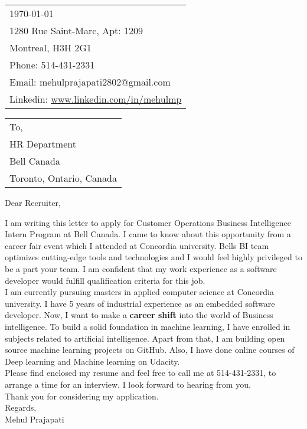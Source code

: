 \documentclass[12pt]{article}
\begin{document}
\thispagestyle{empty}
\vspace*{4\baselineskip}

\hfill
\begin{tabular}{l@{}}
  \today \\[\bigskipamount]
  
  1280 Rue Saint-Marc, Apt: 1209\\
  Montreal, H3H 2G1\\
  Phone: 514-431-2331 \\
  Email: mehulprajapati2802@gmail.com\\
  Linkedin: \href{www.linkedin.com/in/mehulmp}{www.linkedin.com/in/mehulmp}
\end{tabular}

\bigskip

\begin{tabular}{@{}l}
 To,\\
 HR Department \\
 Bell Canada\\
 Toronto, Ontario, Canada
\end{tabular}

\bigskip

Dear Recruiter,

\bigskip
I am writing this letter to apply for Customer Operations Business Intelligence Intern Program at Bell Canada. I came to know about this opportunity from a career fair event which I attended at Concordia university. Bell\textquotesingle s BI team optimizes cutting-edge tools and technologies and I would feel highly privileged to be a part your team. I am confident that my work experience as a software
developer would fulfill qualification criteria for this job.\\

I am currently pursuing masters in applied computer science at Concordia university. I have 5 years of industrial experience as an embedded software developer. Now, I want to make a \textbf{career shift} into the world of Business intelligence. To build a solid foundation in machine learning, I have enrolled in subjects related to artificial intelligence. Apart from that, I am building open source machine learning projects on GitHub. Also, I have done online courses of Deep learning and Machine learning on Udacity.\\

Please find enclosed my resume and feel free to call me at 514-431-2331, to arrange a time for an interview. I look forward to hearing from you.
\\

Thank you for considering my application.
\bigskip
\\

Regards, \\Mehul Prajapati
\end{document}
